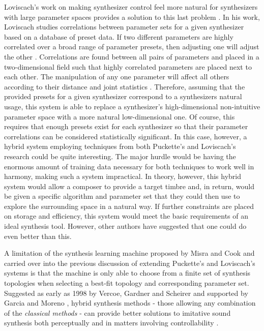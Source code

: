 \documentclass[a4paper,12pt]{report} 	%
\numberwithin{figure}{chapter}
\numberwithin{table}{chapter}
\numberwithin{equation}{chapter}
\begin{document}
\begin{flushleft}
Loviscach's work on making synthesizer control feel more natural for synthesizers with large parameter spaces provides a solution to this last problem \cite{Loviscach:2009mi}. In his work, Loviscach studies correlations between parameter sets for a given synthesizer based on a database of preset data. If two different parameters are highly correlated over a broad range of parameter presets, then adjusting one will adjust the other \cite[p. 1]{Loviscach:2009mi}. Correlations are found between all pairs of parameters and placed in a two-dimensional field such that highly correlated parameters are placed next to each other. The manipulation of any one parameter will affect all others according to their distance and joint statistics \cite[p. 1]{Loviscach:2009mi}. Therefore, assuming that the provided presets for a given synthesizer correspond to a synthesizers natural usage, this system is able to replace a synthesizer's high-dimensional non-intuitive parameter space with a more natural low-dimensional one. Of course, this requires that enough presets exist for each synthesizer so that their parameter correlations can be considered statistically significant. In this case, however, a hybrid system employing techniques from both Puckette's and Loviscach's research could be quite interesting. The major hurdle would be having the enormous amount of training data necessary for both techniques to work well in harmony, making such a system impractical. In theory, however, this hybrid system would allow a composer to provide a target timbre and, in return, would be given a specific algorithm and parameter set that they could then use to explore the surrounding space in a natural way. If further constraints are placed on storage and efficiency, this system would meet the basic requirements of an ideal synthesis tool. However, other authors have suggested that one could do even better than this.

A limitation of the synthesis learning machine proposed by Misra and Cook  \cite[p. 1]{Misra:2009km} and carried over into the previous discussion of extending Puckette's and Loviscach's systems is that the machine is only able to choose from a finite set of synthesis topologies when selecting a best-fit topology and corresponding parameter set. Suggested as early as 1998 by Vercoe, Gardner and Scheirer and supported by Garcia \cite[p. 2]{Garcia:2000th} and Moreno \cite[p. 1]{Moreno:2005bs}, hybrid synthesis methods - those allowing any combination of the \emph{classical methods} - can provide better solutions to imitative sound synthesis both perceptually and in matters involving controllability \cite[p. 9]{Vercoe:1998hh}.


\end{flushleft}
\end{document}
